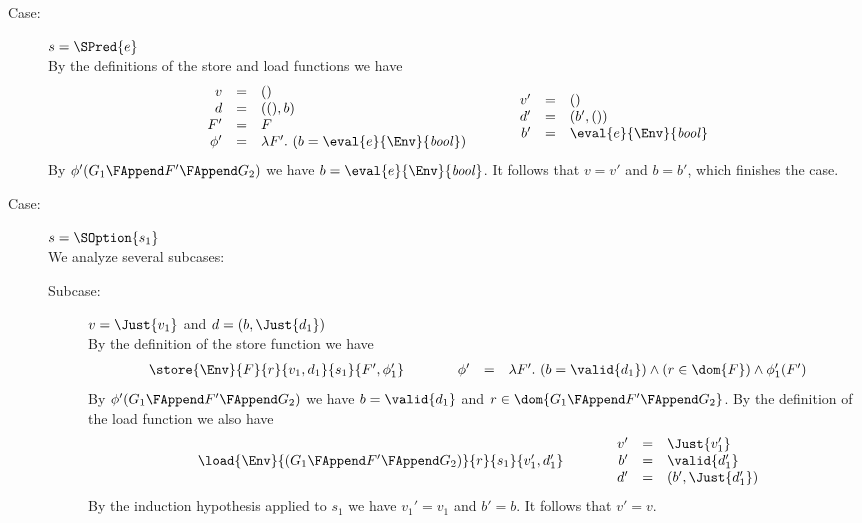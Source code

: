 {\begin{description}
\item[Case:] $s = \SPred{e}$\\[1ex]
%
By the definitions of the store and load functions we have
\[
\begin{array}{rcl}
v &=& ()\\
d &=& ((),b)\\
F' &=& F\\
\phi' &=& \lambda F'.~(b = \eval{e}{\Env}{\mathit{bool}})\\
\end{array}\hspace*{1cm}\begin{array}{rcl}
v' &=& ()\\
d' &=& (b',())\\
b' &=& \eval{e}{\Env}{\mathit{bool}}\\
\end{array}
\]
By $\phi'(G_1 \FAppend F' \FAppend G_2)$ we have $b =
\eval{e}{\Env}{\mathit{bool}}$. It follows that $v = v'$ and $b =
b'$, which finishes the case.

\item[Case:] $s = \SOption{s_1}$\\[1ex]
%
We analyze several subcases:
\begin{description}
\item[Subcase:] $v = \Just{v_1}$ and $d = (b,\Just{d_1})$\\[1ex]
%
By the definition of the store function we have
\[
\begin{array}{l}
\store{\Env}{F}{r}{ v_1,d_1 }{s_1}{F',\phi_1'}\\
\end{array}\hspace*{1cm}\begin{array}{rcl}
\phi' &=& \lambda F'.~(b = \valid{d_1}) \wedge (r \in \dom{F}) \wedge \phi_1'(F')\\
\end{array}
\]
%
By $\phi'(G_1 \FAppend F' \FAppend G_2)$ we have $b = \valid{d_1}$ and
$r \in \dom{G_1 \FAppend F' \FAppend G_2}$.  By the definition of the
load function we also have
\[ 
\begin{array}{rcll}
\load{\Env}{(G_1 \FAppend F' \FAppend G_2)}{r}{s_1}{v_1',d_1'}\\
\end{array}\hspace*{1cm}\begin{array}{rcl}
v' &=& \Just{v_1'}\\
b' &=& \valid{d_1'}\\
d' &=& (b',\Just{d_1'})\\
\end{array}
\]
By the induction hypothesis applied to $s_1$ we have $v_1' = v_1$ and
$b' = b$. It follows that $v' = v$.


\end{description}
\end{description}}
